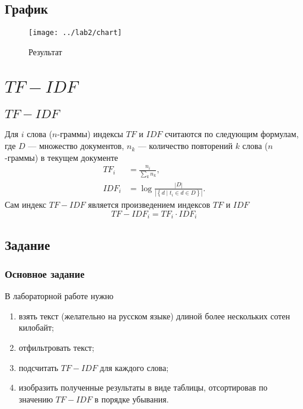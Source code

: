 \lstset{inputencoding=utf8, extendedchars=\true}


\section{График}
\begin{figure}[h]
  \centering
  \texttt{[image: ../lab2/chart]}
  \caption{Результат}
\end{figure}

\chapter{$TF-IDF$}

\section{$TF-IDF$}
Для $i$ слова ($n$-граммы) индексы $TF$ и $IDF$ считаются
по следующим формулам, где
$D$ --- множество документов,
$n_k$ --- количество повторений $k$ слова ($n$-граммы) в текущем документе
\begin{equation*}
  \begin{split}
    TF_i  &= \frac{n_i}{\sum_{k} n_k}, \\
    IDF_i &= \log {\frac{\left| D \right|}{
                   \left| \left\{ d \mid t_i \in d \in D \right\} \right|}}.
  \end{split}
\end{equation*}
Сам индекс $TF-IDF$ является произведением индексов $TF$ и $IDF$
\begin{equation*}
  TF-IDF_i = TF_i \cdot IDF_i
\end{equation*}

\section{Задание}

\subsection{Основное задание}
В лабораторной работе нужно
\begin{enumerate}
  \item
    взять текст (желательно на русском языке)
    длиной более нескольких сотен килобайт;
  \item
    отфильтровать текст;
  \item
    подсчитать $TF-IDF$ для каждого слова;
  \item
    изобразить полученные результаты в виде таблицы,
    отсортировав по значению $TF-IDF$ в порядке убывания.
\end{enumerate}

